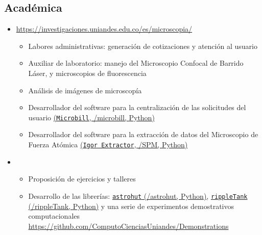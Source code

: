 \documentclass[11pt, letterpaper, sans]{moderncv}        %
\begin{document}
	\subsection{Acad\'emica}
		\begin{itemize}
			\item
			{
				{
					\url{https://investigaciones.uniandes.edu.co/es/microscopia/}
					\vspace{3pt}
					\begin{itemize}
						\item Labores administrativas: generación de cotizaciones y atención al usuario
						\item Auxiliar de laboratorio: manejo del Microscopio Confocal de Barrido Láser, y microscopios de fluorescencia
						\item Análisis de imágenes de microscopía
						\item Desarrollador del software para la centralización de las solicitudes del usuario \href{https://github.com/jsbarbosa/microbill}{(\texttt{Microbill}, \faGithub/microbill, {\color{blue} Python})}
						\item Desarrollador del software para la extracci\'on de datos del Microscopio de Fuerza Atómica
						\href{https://github.com/jsbarbosa/SPM}{(\texttt{Igor Extractor}, \faGithub/SPM, {\color{blue} Python})}
					\end{itemize}
				}
			}
			\item
			{
				{
					\vspace{3pt}
					\begin{itemize}
						\item Proposición de ejercicios y talleres
						\item Desarrollo de las librerías: \href{https://github.com/jsbarbosa/astrohut}{\texttt{astrohut} (\faGithub/astrohut, {\color{blue} Python})},  \href{https://github.com/jsbarbosa/rippleTank}{\texttt{rippleTank} (\faGithub/rippleTank, {\color{blue} Python})} y una serie de experimentos demostrativos computacionales \url{https://github.com/ComputoCienciasUniandes/Demonstrations}

\end{itemize}}}
\end{itemize}
\end{document}
